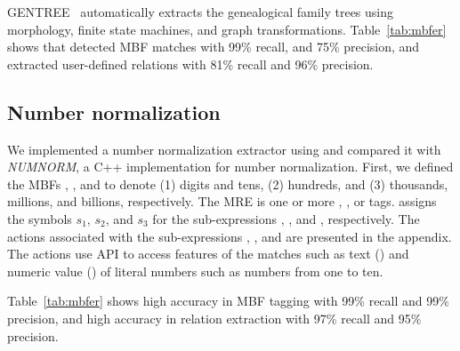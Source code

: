 GENTREE~\cite{ZaMaHaCicling2012Entity} 
automatically extracts the genealogical family trees using morphology, 
finite state machines, and graph transformations. 
Table~\ref{tab:mbfer} shows that \framework detected 
MBF matches with 99\% recall, and 75\% precision, and
extracted user-defined relations with 81\% recall and 96\% precision.

\vspace{-1em}
\subsection{Number normalization}
\label{sec:sec:number}

We implemented a number normalization extractor using \framework and 
compared it with {\em NUMNORM}, a 
C++ implementation for number normalization. 
First, we defined the MBFs , , and 
to denote (1) digits and tens, (2) hundreds, and (3) 
thousands, millions, and billions, respectively.
The  MRE 
 is one or more , , or  tags. 
\framework assigns the symbols $s_1$, $s_2$, and $s_3$ 
for the sub-expressions , , and , respectively. 
The actions associated with the sub-expressions , , and  are presented in the appendix.
The actions use \framework API to access features of the matches such 
as text () and numeric 
value () of literal numbers such as numbers from one to ten.

Table~\ref{tab:mbfer} shows high accuracy in MBF tagging with 99\% recall and 99\% precision, and
high accuracy in relation extraction with 97\% recall and 95\% precision.

